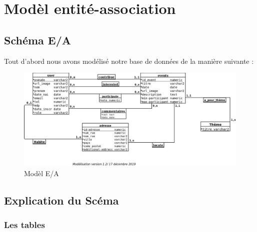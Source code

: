 \documentclass[oneside,11pt,a4paper]{article}
\begin{document}
\section{Modèl entité-association}

\subsection{Schéma E/A}

Tout d'abord nous avons modélisé notre base de données de la manière suivante :

\begin{figure}[h]
  \centering
  \includegraphics[width=1\textwidth]{img/modelisation.jpeg}
  \caption{Modèl E/A}
\end{figure}

\subsection{Explication du Scéma}

\subsubsection*{Les tables}
\end{document}
